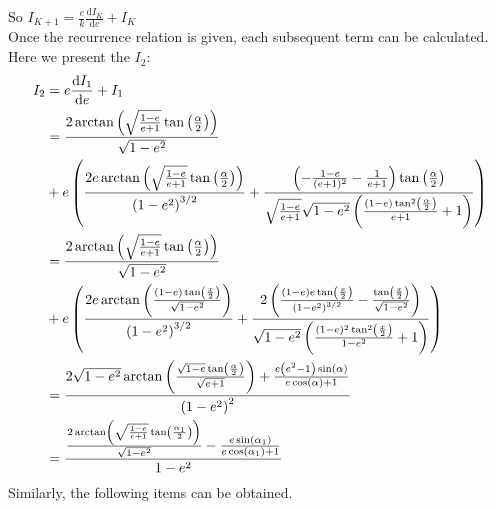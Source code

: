 \documentclass[11pt,en]{elegantpaper}
\begin{document}
So $I_{K+1}=\frac{e}{k}\frac{ \mathrm{d}I_K}{ \mathrm{d}e}+I_K$\\
Once the recurrence relation is given, each subsequent term can be calculated.\\
Here we present the $I_2$:
\begin{align*}
	I_2 & =e \frac{ \mathrm{d}I_1}{\mathrm{d}e}+I_1                                                                                                                                                                                                                                                                                                                            \\
	    & =\frac{2 \arctan\left(\sqrt{\frac{1-e}{e+1}} \tan \left(\frac{\alpha }{2}\right)\right)}{\sqrt{1-e^2}}                                                                                                                                                                                                                                                               \\ \notag
	    & +e \left(\frac{2 e \arctan\left(\sqrt{\frac{1-e}{e+1}} \tan \left(\frac{\alpha }{2}\right)\right)}{\left(1-e^2\right)^{3/2}}+\frac{\left(-\frac{1-e}{(e+1)^2}-\frac{1}{e+1}\right) \tan \left(\frac{\alpha }{2}\right)}{\sqrt{\frac{1-e}{e+1}} \sqrt{1-e^2} \left(\frac{(1-e) \tan ^2\left(\frac{\alpha }{2}\right)}{e+1}+1\right)}\right)                           \\
	    & =\frac{2 \arctan\left(\sqrt{\frac{1-e}{e+1}} \tan \left(\frac{\alpha }{2}\right)\right)}{\sqrt{1-e^2}}                                                                                                                                                                                                                                                               \\ \notag
	    & +e \left(\frac{2 e \arctan\left(\frac{(1-e) \tan \left(\frac{x}{2}\right)}{\sqrt{1-e^2}}\right)}{\left(1-e^2\right)^{3/2}}+\frac{2 \left(\frac{(1-e) e \tan \left(\frac{x}{2}\right)}{\left(1-e^2\right)^{3/2}}-\frac{\tan \left(\frac{x}{2}\right)}{\sqrt{1-e^2}}\right)}{\sqrt{1-e^2} \left(\frac{(1-e)^2 \tan ^2\left(\frac{x}{2}\right)}{1-e^2}+1\right)}\right) \\
	    & =\frac{2 \sqrt{1-e^2} \arctan\left(\frac{\sqrt{1-e} \tan \left(\frac{\alpha }{2}\right)}{\sqrt{e+1}}\right)+\frac{e \left(e^2-1\right) \sin (\alpha )}{e \cos (\alpha )+1}}{\left(1-e^2\right)^2}                                                                                                                                                                    \\
	    & =\frac{\frac{2 \arctan\left(\sqrt{\frac{1-e}{e+1}} \tan \left(\frac{\alpha _1}{2}\right)\right)}{\sqrt{1-e^2}}-\frac{e \sin \left(\alpha _1\right)}{e \cos \left(\alpha _1\right)+1}}{1-e^2}
\end{align*}
Similarly, the following items can be obtained.
\addappheadtotoc
\end{document}
